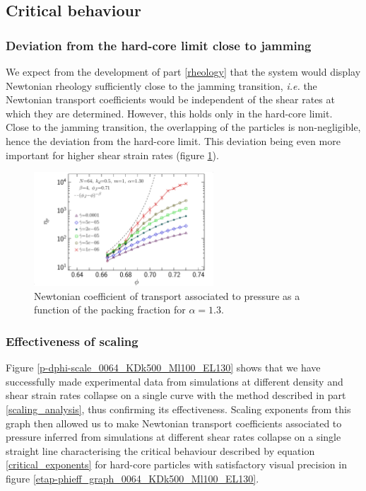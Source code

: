 \documentclass[class=report, float=false, crop=false]{standalone}
\begin{document}
\subsection{Critical behaviour}

\subsubsection{Deviation from the hard-core limit close to jamming}
\label{deviation_hard-core_limit}

We expect from the development of part \ref{rheology} that the system would display Newtonian rheology sufficiently close to the jamming transition, \textit{i.e.} the Newtonian transport coefficients would be independent of the shear rates at which they are determined. However, this holds only in the hard-core limit.\\

Close to the jamming transition, the overlapping of the particles is non-negligible, hence the deviation from the hard-core limit. This deviation being even more important for higher shear strain rates (figure \ref{etap-phi_0064_KDk500_Ml100_EL130}).

\begin{figure}[h!]
\centering
\includegraphics[width=0.6\textwidth]{figures/figs/etap-phi_0064_KDk500_Ml100_EL130}
\caption{Newtonian coefficient of transport associated to pressure as a function of the packing fraction for $\alpha=1.3$.}
\label{etap-phi_0064_KDk500_Ml100_EL130}
\end{figure}

\subsubsection{Effectiveness of scaling}

Figure \ref{p-dphi-scale_0064_KDk500_Ml100_EL130} shows that we have successfully made experimental data from simulations at different density and shear strain rates collapse on a single curve with the method described in part \ref{scaling_analysis}, thus confirming its effectiveness. Scaling exponents from this graph then allowed us to make Newtonian transport coefficients associated to pressure inferred from simulations at different shear rates collapse on a single straight line characterising the critical behaviour described by equation \ref{critical_exponents} for hard-core particles with satisfactory visual precision in figure \ref{etap-phieff_graph_0064_KDk500_Ml100_EL130}.\\
\end{document}
